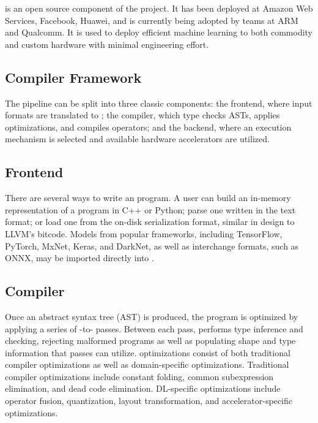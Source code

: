 \relay is an open source component of the \tvm project.
It has been deployed at Amazon Web Services, Facebook, Huawei,
  and is currently being adopted by teams at ARM and Qualcomm.
It is used to deploy efficient machine learning to
  both commodity and custom hardware with minimal
  engineering effort.

\subsection{Compiler Framework}
  The \relay pipeline can be split into three classic components:
    the frontend, where input formats are translated to \relay;
    the compiler, which type checks \relay ASTs, applies optimizations,
      and compiles operators;
    and the backend, where an execution mechanism is selected and
      available hardware accelerators are utilized.

  \subsection{Frontend}

  There are several ways to write an \relay program.
  A user can build an in-memory representation of
    a program in C++ or Python;
    parse one written in the \relay text format;
    or load one from the on-disk serialization format,
    similar in design to LLVM's bitcode.
  Models from popular frameworks, including
    TensorFlow, PyTorch, MxNet, Keras, and DarkNet, as well as interchange
    formats, such as ONNX, may be imported directly into \relay.
  \subsection{Compiler}
  Once an \relay abstract syntax tree (AST) is produced,
    the program is optimized by applying a series of \relay-to-\relay
    passes.
  Between each pass, \relay performs type inference and checking,
    rejecting malformed programs as well as populating shape and type
    information that passes can utilize.
  \relay optimizations consist of both traditional compiler
    optimizations as well as domain-specific optimizations.
  Traditional compiler optimizations include constant folding,
    common subexpression elimination,
    and dead code elimination.
  DL-specific optimizations include
    operator fusion,
    quantization,
    layout transformation,
    and accelerator-specific optimizations.

